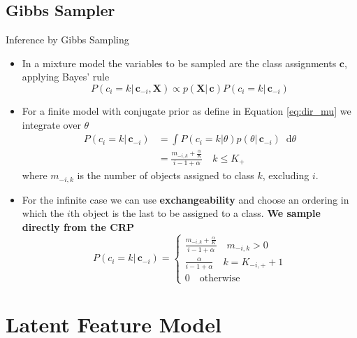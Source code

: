 \documentclass[aspectratio=169,xcolor=dvipsnames]{beamer}
\newcommand*\diff{\mathop{}\!\mathrm{d}}
\newcommand{\vecc}{\textbf{c}}
\newcommand{\matx}{\textbf{X}}
\newcommand{\aOverK}{\frac{\alpha}{K}}
\begin{document}
\subsection{Gibbs Sampler}
\begin{frame}{Inference by Gibbs Sampling}
\setlength{\leftmargini}{0.2cm}
\begin{itemize}
\item In a mixture model the variables to be sampled are the class assignments $\vecc$, applying Bayes’ rule
\begin{equation*}
    P(c_i=k |\,\vecc_{-i}, \matx ) \propto p(\matx|\, \vecc) P(c_i=k|\,\vecc_{-i})
\end{equation*}
\item For a finite model with conjugate prior as define in Equation \ref{eq:dir_mu} we integrate over $\theta$
\begin{align*}
    P(c_i=k |\,\vecc_{-i}) &= \int P(c_i=k|\theta) p(\theta |\,\vecc_{-i}) \diff \theta \\
    &= \frac{m_{-i,k}+\aOverK}{i-1+\alpha} \quad k\leq K_+
\end{align*}
where $m_{-i,k}$ is the number of objects assigned to class $k$, excluding $i$.
\item For the infinite case we can use \textbf{exchangeability} and choose an ordering in which the $i$th object is the last to be assigned to a class. \textbf{We sample directly from the CRP}
\begin{equation*}
    P(c_i = k|\, \vecc_{-i})  =\begin{cases}
        \frac{m_{-i,k}+\aOverK}{i-1+\alpha} \quad m_{-i,k}>0\\
        \frac{\alpha}{i-1+\alpha} \quad k = K_{-i,+} + 1 \\
        0 \quad \text{otherwise}
    \end{cases}
\end{equation*}
\end{itemize}
\end{frame}

\section{Latent Feature Model}
\end{document}
